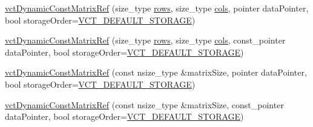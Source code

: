 {\bf }\par
\begin{DoxyCompactItemize}
\item 
\hyperlink{classvct_dynamic_const_matrix_ref_a79de2ff0f28735135f02e5faeeb2b4ec}{vct\+Dynamic\+Const\+Matrix\+Ref} (size\+\_\+type \hyperlink{classvct_dynamic_const_matrix_base_a5eac13be2207ebeb8766cde379d73438}{rows}, size\+\_\+type \hyperlink{classvct_dynamic_const_matrix_base_aa6c51d41a100da49a7e7ac7edb20ecd9}{cols}, pointer data\+Pointer, bool storage\+Order=\hyperlink{vct_forward_declarations_8h_aacdb3b0140beef8a3c2025b808b74a73}{V\+C\+T\+\_\+\+D\+E\+F\+A\+U\+L\+T\+\_\+\+S\+T\+O\+R\+A\+G\+E})
\item 
\hyperlink{classvct_dynamic_const_matrix_ref_a8a0633710caa3bc511cdb9a47b61c998}{vct\+Dynamic\+Const\+Matrix\+Ref} (size\+\_\+type \hyperlink{classvct_dynamic_const_matrix_base_a5eac13be2207ebeb8766cde379d73438}{rows}, size\+\_\+type \hyperlink{classvct_dynamic_const_matrix_base_aa6c51d41a100da49a7e7ac7edb20ecd9}{cols}, const\+\_\+pointer data\+Pointer, bool storage\+Order=\hyperlink{vct_forward_declarations_8h_aacdb3b0140beef8a3c2025b808b74a73}{V\+C\+T\+\_\+\+D\+E\+F\+A\+U\+L\+T\+\_\+\+S\+T\+O\+R\+A\+G\+E})
\item 
\hyperlink{classvct_dynamic_const_matrix_ref_a37c64ae8926df315560b5aa27f37b49d}{vct\+Dynamic\+Const\+Matrix\+Ref} (const nsize\+\_\+type \&matrix\+Size, pointer data\+Pointer, bool storage\+Order=\hyperlink{vct_forward_declarations_8h_aacdb3b0140beef8a3c2025b808b74a73}{V\+C\+T\+\_\+\+D\+E\+F\+A\+U\+L\+T\+\_\+\+S\+T\+O\+R\+A\+G\+E})
\item 
\hyperlink{classvct_dynamic_const_matrix_ref_a80b76aace4992dd54c7dc39e6bc3daba}{vct\+Dynamic\+Const\+Matrix\+Ref} (const nsize\+\_\+type \&matrix\+Size, const\+\_\+pointer data\+Pointer, bool storage\+Order=\hyperlink{vct_forward_declarations_8h_aacdb3b0140beef8a3c2025b808b74a73}{V\+C\+T\+\_\+\+D\+E\+F\+A\+U\+L\+T\+\_\+\+S\+T\+O\+R\+A\+G\+E})
\end{DoxyCompactItemize}

